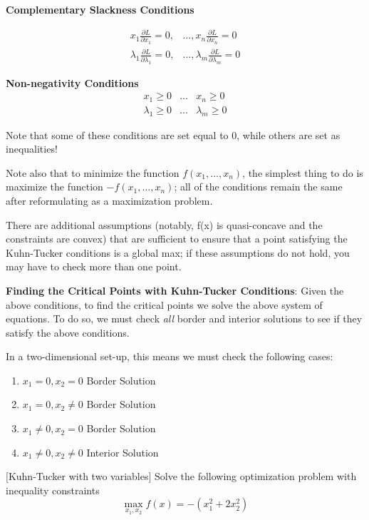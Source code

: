 \documentclass[]{book}
\providecommand{\tightlist}{%
  \setlength{\itemsep}{0pt}\setlength{\parskip}{0pt}}
\theoremstyle{definition}
\theoremstyle{definition}
\theoremstyle{definition}
\theoremstyle{remark}
\begin{document}
\textbf{Complementary Slackness Conditions}

\begin{align*}
x_1\frac{\partial L}{\partial x_1} = 0, & \dots, x_n\frac{\partial L}{\partial x_n} = 0\\
\lambda_1\frac{\partial L}{\partial \lambda_1} = 0, & \dots, \lambda_m \frac{\partial L}{\partial \lambda_m} = 0
\end{align*}

\textbf{Non-negativity Conditions}
\begin{eqnarray*}
x_1 \geq 0 & \dots & x_n \geq 0\\
\lambda_1 \geq 0 & \dots & \lambda_m \geq 0
\end{eqnarray*}

Note that some of these conditions are set equal to 0, while others are set as inequalities!

Note also that to minimize the function \(f(x_1, \dots, x_n)\), the simplest thing to do is maximize the function \(-f(x_1, \dots, x_n)\); all of the conditions remain the same after reformulating as a maximization problem.

There are additional assumptions (notably, f(x) is quasi-concave and the constraints are convex) that are sufficient to ensure that a point satisfying the Kuhn-Tucker conditions is a global max; if these assumptions do not hold, you may have to check more than one point.

\textbf{Finding the Critical Points with Kuhn-Tucker Conditions}: Given the above conditions, to find the critical points we solve the above system of equations. To do so, we must check \textit{all} border and interior solutions to see if they satisfy the above conditions.

In a two-dimensional set-up, this means we must check the following cases:

\begin{enumerate}
\def\labelenumi{\arabic{enumi}.}
\tightlist
\item
  \(x_1 = 0, x_2 = 0\) Border Solution
\item
  \(x_1 = 0, x_2 \neq 0\) Border Solution
\item
  \(x_1 \neq 0, x_2 = 0\) Border Solution
\item
  \(x_1 \neq 0, x_2 \neq 0\) Interior Solution
\end{enumerate}

[Kuhn-Tucker with two variables]
\protect\hypertarget{exm:unnamed-chunk-63}{}{\label{exm:unnamed-chunk-63} {} }Solve the following optimization problem with inequality constraints
\[\max_{x_1,x_2} f(x) = -(x_1^2 + 2x_2^2)\]
\end{document}
